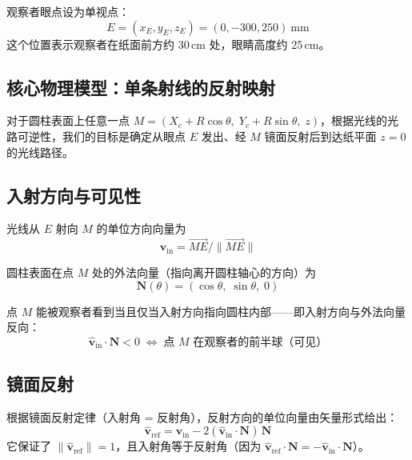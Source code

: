 \documentclass[12pt,a4paper]{ctexart}
\begin{document}
观察者眼点设为单视点：
\begin{equation}
    E = (x_E, y_E, z_E) = (0, -300, 250)\ \mathrm{mm}
\end{equation}
这个位置表示观察者在纸面前方约 30\,cm 处，眼睛高度约 25\,cm。

\subsection{核心物理模型：单条射线的反射映射}

对于圆柱表面上任意一点 $M = (X_c+R\cos\theta,\; Y_c+R\sin\theta,\; z)$，根据光线的光路可逆性，我们的目标是确定从眼点 $E$ 发出、经 $M$ 镜面反射后到达纸平面 $z=0$ 的光线路径。

\subsection{入射方向与可见性}

光线从 $E$ 射向 $M$ 的单位方向向量为
\begin{equation}
    \hat{\mathbf{v}}_{\mathrm{in}} = \overrightarrow{ME}/ \|\overrightarrow{ME}\|
\end{equation}

圆柱表面在点 $M$ 处的外法向量（指向离开圆柱轴心的方向）为
\begin{equation}
    \mathbf{N}(\theta) = (\cos\theta,\; \sin\theta,\; 0)
\end{equation}

点 $M$ 能被观察者看到当且仅当入射方向指向圆柱内部——即入射方向与外法向量反向：
\begin{equation}
    \hat{\mathbf{v}}_{\mathrm{in}} \cdot \mathbf{N} < 0 \;\Longleftrightarrow\; \text{点 $M$ 在观察者的前半球（可见）}
\end{equation}

\subsection{镜面反射}

根据镜面反射定律（入射角 = 反射角），反射方向的单位向量由矢量形式给出：
\begin{equation}\label{eq:specular}
    \hat{\mathbf{v}}_{\mathrm{ref}} = \hat{\mathbf{v}}_{\mathrm{in}} - 2(\hat{\mathbf{v}}_{\mathrm{in}}\cdot\mathbf{N})\,\mathbf{N}
\end{equation}
它保证了 $\|\hat{\mathbf{v}}_{\mathrm{ref}}\|=1$，且入射角等于反射角（因为 $\hat{\mathbf{v}}_{\mathrm{ref}}\cdot\mathbf{N} = -\hat{\mathbf{v}}_{\mathrm{in}}\cdot\mathbf{N}$）。
\end{document}
